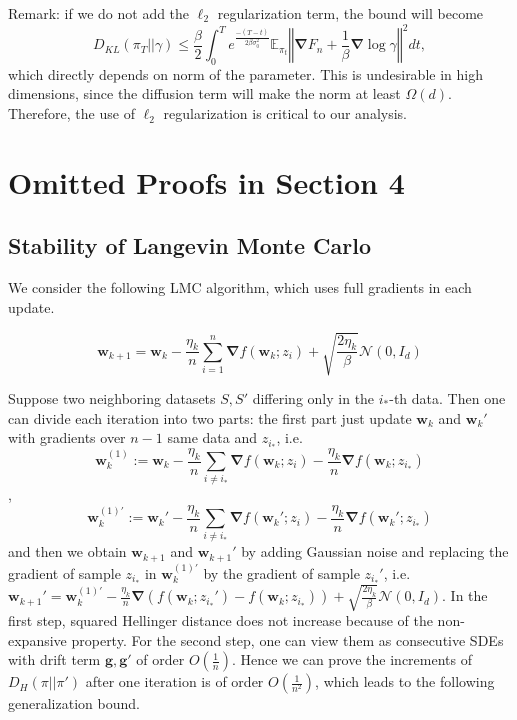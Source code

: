 \documentclass[final,12pt]{colt2018} %
\newcommand{\w}{\bm{w}}
\begin{document}
Remark: if we do not add the $\ell_2$ regularization term, the bound will become
\begin{equation}
  D_{KL}(\pi_T||\gamma)\leq \frac{\beta}{2}\int_{0}^T e^{\frac{-(T-t)}{2\beta \sigma_0^2}}\mathbb{E}_{\pi_t} \left\Vert \bm{\nabla}F_n+\frac{1}{\beta}\bm{\nabla}\log \gamma\right\Vert^2dt,
\end{equation}
which directly depends on norm of the parameter. This is undesirable in high dimensions, since the diffusion term will make the norm at least $\Omega(d)$. Therefore, the use of $\ell_2$ regularization is critical to our analysis.
\section{Omitted Proofs in Section 4}
\subsection{Stability of Langevin Monte Carlo}\label{section: langevinMC}
We consider the following LMC algorithm, which uses full gradients in each update.

\begin{equation}
  \bm{w}_{k+1}=\bm{w}_k-\frac{\eta_k}{n}\sum_{i=1}^n\bm{\nabla} f(\bm{w}_k;z_i)+\sqrt{\frac{2\eta_k}{\beta}} \mathcal{N}(0,I_d)
\end{equation}

Suppose two neighboring datasets $S,S'$ differing only in the $i_*$-th data. Then one can divide each iteration into two parts: the first part just update $\w_k$ and $\w_k'$ with gradients over $n-1$ same data and $z_{i_*}$, i.e. 
\begin{equation}
  \w_k^{(1)} := \w_k - \frac{\eta_k}{n}\sum_{i \neq i_*} \bm{\nabla} f(\bm{w}_k;z_i)- \frac{\eta_k}{n}\bm{\nabla} f(\bm{w}_k;z_{i_*}) 
\end{equation},
\begin{equation}
  \w_k^{(1)\prime} := \w_k' - \frac{\eta_k}{n}\sum_{i \neq i_*} \bm{\nabla} f(\bm{w}_k';z_i)- \frac{\eta_k}{n}\bm{\nabla} f(\bm{w}_k';z_{i_*}) 
 \end{equation} and then we obtain $\bm{w}_{k+1}$ and $\bm{w}_{k+1}'$ by adding Gaussian noise and replacing the gradient of sample $z_{i_*}$ in $\bm{w}_k^{(1)\prime}$ by the gradient of sample $z_{i_*}'$, i.e. $\w_{k+1}' = {\w_k^{(1)\prime}} - \frac{\eta_k}{n} \bm{\nabla} (f(\bm{w}_k;z_{i_*}')-f(\bm{w}_k;z_{i_*})) + \sqrt{\frac{2\eta_k}{\beta}} \mathcal{N}(0,I_d)$.
In the first step, squared Hellinger distance does not increase because of the non-expansive property. For the second step, one can view them as consecutive SDEs with drift term $\bm{g},\bm{g}'$ of order $O(\frac{1}{n})$. Hence we can prove the increments of $D_H(\pi||\pi')$ after one iteration is of order $O(\frac{1}{n^2})$, which leads to the following generalization bound.
\end{document}
